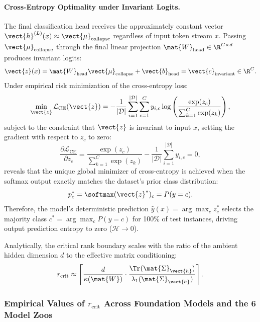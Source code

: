 \paragraph{Cross-Entropy Optimality under Invariant Logits.}
The final classification head receives the approximately constant vector $\vect{h}^{(L)}(x) \approx \vect{\mu}_{\text{collapse}}$ regardless of input token stream $x$. Passing $\vect{\mu}_{\text{collapse}}$ through the final linear projection $\mat{W}_{\text{head}} \in \R^{C \times d}$ produces invariant logits:
\begin{equation}
\vect{z}(x) = \mat{W}_{\text{head}} \vect{\mu}_{\text{collapse}} + \vect{b}_{\text{head}} = \vect{c}_{\text{invariant}} \in \R^C.
\end{equation}
Under empirical risk minimization of the cross-entropy loss:
\begin{equation}
\min_{\vect{z}} \mathcal{L}_{\text{CE}}(\vect{z}) = - \frac{1}{|\mathcal{D}|} \sum_{i=1}^{|\mathcal{D}|} \sum_{c=1}^C y_{i, c} \log \left( \frac{\exp(z_c)}{\sum_{k=1}^C \exp(z_k)} \right),
\end{equation}
subject to the constraint that $\vect{z}$ is invariant to input $x$, setting the gradient with respect to $z_c$ to zero:
\begin{equation}
\frac{\partial \mathcal{L}_{\text{CE}}}{\partial z_c} = \frac{\exp(z_c)}{\sum_{k=1}^C \exp(z_k)} - \frac{1}{|\mathcal{D}|}\sum_{i=1}^{|\mathcal{D}|} y_{i, c} = 0,
\end{equation}
reveals that the unique global minimizer of cross-entropy is achieved when the softmax output exactly matches the dataset's prior class distribution:
\begin{equation}
p_c^* = \softmax(\vect{z}^*)_c = P(y = c).
\end{equation}
Therefore, the model's deterministic prediction $\hat{y}(x) = \arg\max_c z_c^*$ selects the majority class $c^* = \arg\max_c P(y=c)$ for 100\% of test instances, driving output prediction entropy to zero ($\mathcal{H} \to 0$).

Analytically, the critical rank boundary scales with the ratio of the ambient hidden dimension $d$ to the effective matrix conditioning:
\begin{equation}
\label{eq:r_crit_formula}
r_{\text{crit}} \approx \left\lceil \frac{d}{\kappa(\mat{W})} \cdot \frac{\Tr(\mat{\Sigma}_{\vect{h}})}{\lambda_1(\mat{\Sigma}_{\vect{h}})} \right\rceil.
\end{equation}

\subsubsection{Empirical Values of $r_{\text{crit}}$ Across Foundation Models and the 6 Model Zoos}
\label{sec:phenom_rank_empirical_table}

